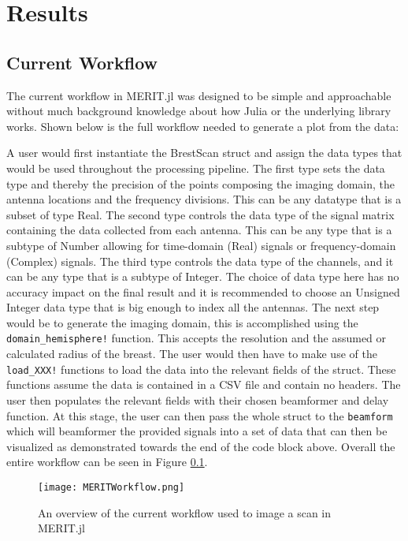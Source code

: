 \setcounter{chapter}{4}
\setcounter{section}{0}
\setcounter{subsection}{0}
\chapter*{Results}
\section{Current Workflow}
\label{CurrentWorkflow}
The current workflow in MERIT.jl was designed to be simple and approachable without much background knowledge about how
Julia or the underlying library works. Shown below is the full workflow needed to generate a plot from the data:

A user would first instantiate the BrestScan struct and assign the data types that would be used throughout the
processing pipeline. The first type sets the data type and thereby the precision of the points composing the imaging
domain, the antenna locations and the frequency divisions. This can be any datatype that is a subset of type Real. The
second type controls the data type of the signal matrix containing the data collected from each antenna. This can be any
type that is a subtype of Number allowing for time-domain (Real) signals or frequency-domain (Complex) signals. The
third type controls the data type of the channels, and it can be any type that is a subtype of Integer. The choice of
data type here has no accuracy impact on the final result and it is recommended to choose an Unsigned Integer data type
that is big enough to index all the antennas. The next step would be to generate the imaging domain, this is
accomplished using the \lstinline[language=Julia]{domain_hemisphere!} function. This accepts the resolution and the
assumed or calculated radius of the breast. The user would then have to make use of the
\lstinline[language=Julia]{load_XXX!} functions to load the data into the relevant fields of the struct. These functions
assume the data is contained in a CSV file and contain no headers. The user then populates the relevant fields with
their chosen beamformer and delay function. At this stage, the user can then pass the whole struct to the
\lstinline[language=Julia]{beamform} which will beamformer the provided signals into a set of data that can then be
visualized as demonstrated towards the end of the code block above. Overall the entire workflow can be seen in Figure
\ref{fig:MERITWorkflow}.

\begin{figure}[h!]
    \texttt{[image: MERITWorkflow.png]}
    \centering
    \caption{An overview of the current workflow used to image a scan in MERIT.jl} 
    \label{fig:MERITWorkflow}
\end{figure}

